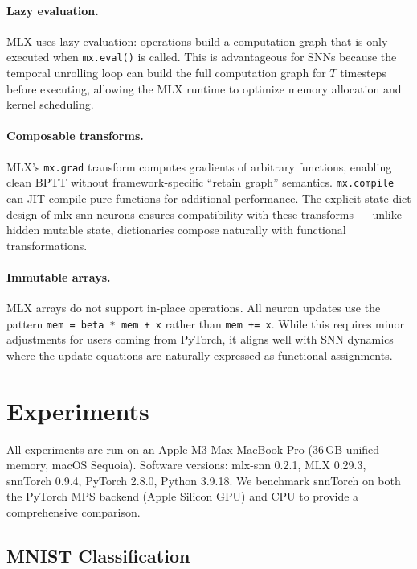\documentclass[11pt]{article}
\begin{document}
\paragraph{Lazy evaluation.}
MLX uses lazy evaluation: operations build a computation graph that is only executed when \texttt{mx.eval()} is called. This is advantageous for SNNs because the temporal unrolling loop can build the full computation graph for $T$ timesteps before executing, allowing the MLX runtime to optimize memory allocation and kernel scheduling.

\paragraph{Composable transforms.}
MLX's \texttt{mx.grad} transform computes gradients of arbitrary functions, enabling clean BPTT without framework-specific ``retain graph'' semantics. \texttt{mx.compile} can JIT-compile pure functions for additional performance. The explicit state-dict design of mlx-snn neurons ensures compatibility with these transforms --- unlike hidden mutable state, dictionaries compose naturally with functional transformations.

\paragraph{Immutable arrays.}
MLX arrays do not support in-place operations. All neuron updates use the pattern \texttt{mem = beta * mem + x} rather than \texttt{mem += x}. While this requires minor adjustments for users coming from PyTorch, it aligns well with SNN dynamics where the update equations are naturally expressed as functional assignments.

\section{Experiments}

All experiments are run on an Apple M3 Max MacBook Pro (36\,GB unified memory, macOS Sequoia). Software versions: mlx-snn 0.2.1, MLX 0.29.3, snnTorch 0.9.4, PyTorch 2.8.0, Python 3.9.18. We benchmark snnTorch on both the PyTorch MPS backend (Apple Silicon GPU) and CPU to provide a comprehensive comparison.

\subsection{MNIST Classification}
\end{document}
